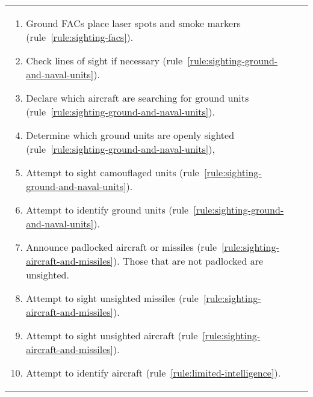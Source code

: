 \begin{twocolumntablefloat}
\begin{twocolumntable}
\begin{tabularx}{1.0\linewidth}{L@{\hspace{\columnsep}}L}
{\begin{enumerate}[topsep=0pt]
\begin{enumerate}[nosep]
    \item Ground FACs place laser spots and smoke markers (rule~\ref{rule:sighting-facs}).
    \item Check lines of sight if necessary (rule~\ref{rule:sighting-ground-and-naval-units}).
    \item Declare which aircraft are searching for ground units (rule~\ref{rule:sighting-ground-and-naval-units}).
    \item Determine which ground units are openly sighted (rule~\ref{rule:sighting-ground-and-naval-units}),
    \item Attempt to sight camouflaged units (rule~\ref{rule:sighting-ground-and-naval-units}).
    \item Attempt to identify ground units (rule~\ref{rule:sighting-ground-and-naval-units}).
    \item Announce padlocked aircraft or missiles (rule~\ref{rule:sighting-aircraft-and-missiles}). Those that are not padlocked are unsighted.
    \item Attempt to sight unsighted missiles (rule~\ref{rule:sighting-aircraft-and-missiles}).
    \item Attempt to sight unsighted aircraft (rule~\ref{rule:sighting-aircraft-and-missiles}).
    \item Attempt to identify aircraft (rule~\ref{rule:limited-intelligence}).
\end{enumerate}



\end{enumerate}}
\end{tabularx}
\end{twocolumntable}
\end{twocolumntablefloat}
